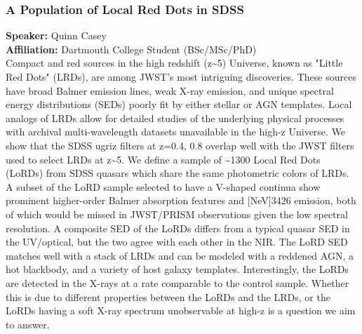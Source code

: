 \hypertarget{abs-56}{}
\subsubsection*{A Population of Local Red Dots in SDSS}
\textbf{Speaker:} Quinn Casey \\
\textbf{Affiliation:} Dartmouth College \textperiodcentered{} Student (BSc/MSc/PhD)\\
Compact and red sources in the high redshift (z\textasciitilde{}5) Universe, known as "Little Red Dots" (LRDs), are among JWST's most intriguing discoveries. These sources have broad Balmer emission lines, weak X-ray emission, and unique spectral energy distributions (SEDs) poorly fit by either stellar or AGN templates. Local analogs of LRDs allow for detailed studies of the underlying physical processes with archival multi-wavelength datasets unavailable in the high-z Universe. We show that the SDSS ugriz filters at z=0.4, 0.8 overlap well with the JWST filters used to select LRDs at z\textasciitilde{}5. We define a sample of \textasciitilde{}1300 Local Red Dots (LoRDs) from SDSS quasars which share the same photometric colors of LRDs. A subset of the LoRD sample selected to have a V-shaped continua show prominent higher-order Balmer absorption features and [NeV]3426 emission, both of which would be missed in JWST/PRISM observations given the low spectral resolution. A composite SED of the LoRDs differs from a typical quasar SED in the UV/optical, but the two agree with each other in the NIR. The LoRD SED matches well with a stack of LRDs and can be modeled with a reddened AGN, a hot blackbody, and a variety of host galaxy templates. Interestingly, the LoRDs are detected in the X-rays at a rate comparable to the control sample. Whether this is due to different properties between the LoRDs and the LRDs, or the LoRDs having a soft X-ray spectrum unobservable at high-z is a question we aim to answer.

\hypertarget{abs-57}{}

